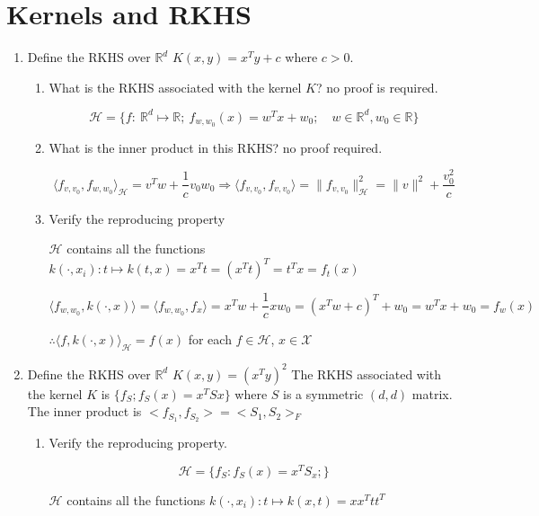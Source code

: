 \documentclass[11pt]{article}
\begin{document}
\section{Kernels and RKHS}
\begin{enumerate}
\item Define the RKHS  over $\mathbb{R}^d$ $K(x,y)=x^Ty+c$ where $c>0$. 

\begin{enumerate}
\item What is the RKHS associated with the kernel $K$? no proof is required. 

$$\mathcal{H} = \{f:\ \mathbb{R}^d\mapsto\mathbb{R};\ f_{w,w_0}(x)=w^Tx+w_0;\quad w\in\mathbb{R}^d,w_0\in\mathbb{R}\}$$





\item What is the inner product in this RKHS? no proof required.  

$$\langle f_{v,v_0},f_{w,w_0}\rangle_{\mathcal{H}}=v^Tw+\frac1cv_0w_0\Rightarrow\langle f_{v,v_0},f_{v,v_0}\rangle=\|f_{v,v_0}\|^2_{\mathcal{H}}=\|v\|^2+\frac{v_0^2}c$$


\item Verify the reproducing property

$\mathcal{H}$ contains all the functions $k(\cdot,x_i): t\mapsto k(t,x)=x^Tt=(x^Tt)^T=t^Tx=f_t(x)$

$$\langle f_{w,w_0},k(\cdot,x)\rangle=\langle f_{w,w_0},f_x\rangle=x^Tw+\frac1cxw_0=(x^Tw+c)^T+w_0=w^Tx+w_0=f_w(x)$$

$\therefore\langle f,k(\cdot,x)\rangle_{\mathcal{H}}=f(x)$ for each $f\in\mathcal{H}$, $x\in\mathcal{X}$

\end{enumerate}


\item Define the RKHS  over $\mathbb{R}^d$
$K(x,y)=(x^Ty)^2$
The RKHS associated with the kernel $K$ is $\{f_S;f_S(x)=x^T S x\}$ where $S$ is a symmetric $(d,d)$ matrix. The inner product is
$<f_{S_1},f_{S_2}>=<S_1,S_2>_F$



\begin{enumerate}
\item Verify the reproducing property. 

$$\mathcal{H} = \{f_S: f_S(x)=x^TS_x;\}$$

$\mathcal{H}$ contains all the functions $k(\cdot,x_i): t\mapsto k(x,t)=xx^Ttt^T$


\end{enumerate}
\end{enumerate}
\end{document}
